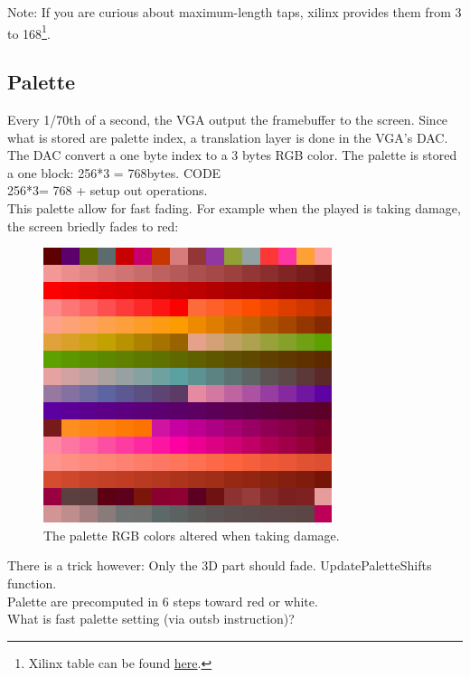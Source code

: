 Note: If you are curious about maximum-length taps, xilinx provides them from 3 to 168\footnote{Xilinx table can be found \href{http://www.xilinx.com/support/documentation/application\_notes/xapp052.pdf}{here}.}.
\subsection{Palette}

Every 1/70th of a second, the VGA output the framebuffer to the screen. Since what is stored are palette index, a translation layer is done in the VGA's DAC. The DAC convert a one byte index to a 3 bytes RGB color. The palette is stored a one block: 256*3 = 768bytes. 
CODE\\
256*3= 768 + setup out operations.\\
This palette allow for fast fading. For example when the played is taking damage, the screen briedly fades to red:
\begin{figure}[H]
  \centering
 \includegraphics[width=\textwidth]{imgs/palette_damage.png}
 \caption{The palette RGB colors altered when taking damage.} \label{fig:palette_damage}
\end{figure}
There is a trick however: Only the 3D part should fade. UpdatePaletteShifts function.\\
Palette are precomputed in 6 steps toward red or white.\\
What is fast palette setting (via outsb instruction)?\\

